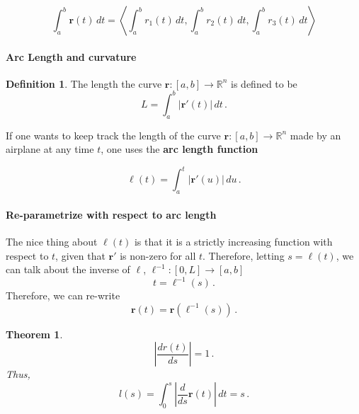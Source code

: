 \documentclass[
]{article}
\newtheorem{theorem}{Theorem}[section]
\theoremstyle{definition}
\newtheorem{definition}{Definition}[section]
\theoremstyle{definition}
\theoremstyle{definition}
\theoremstyle{definition}
\theoremstyle{remark}
\begin{document}
\begin{equation*}
    \int_a^b \mathbf{r}(t) \, dt = \left\langle \int_a^b r_1(t) \, dt, \int_a^b r_2(t) \, dt, \int_a^b r_3(t) \, dt \right\rangle
\end{equation*}

\paragraph{Arc Length and curvature}\label{arc-length-and-curvature}

\begin{definition}
The length the curve \(\mathbf{r}:[a,b] \to \mathbb{R}^n\) is defined to be
\begin{equation*}
L = \int_a^b \left| \mathbf{r}'(t) \right| \, dt \,.
\end{equation*}
\end{definition}

If one wants to keep track the length of the curve \(\mathbf{r}:[a,b] \to \mathbb{R}^n\) made by an airplane
at any time \(t\), one uses the \textbf{arc length function}

\begin{equation*}
    \ell(t) = \int_a^t \left| \mathbf{r}'(u) \right| \, du \,.
\end{equation*}

\paragraph*{Re-parametrize with respect to arc length}\label{re-parametrize-with-respect-to-arc-length}

The nice thing about \(\ell(t)\) is that it is a strictly increasing function with respect to \(t\),
given that \(\mathbf{r}'\) is non-zero for all \(t\).
Therefore, letting \(s = \ell(t)\), we can talk about the inverse of \(\ell\), \(\ell^{-1}:[0,L] \to [a,b]\)
\begin{equation*}
    t = \ell^{-1}(s) \,.
\end{equation*}
Therefore, we can re-write
\begin{equation*}
\mathbf{r}(t) = \mathbf{r}(\ell^{-1}(s)) \,.
\end{equation*}

\begin{theorem}
\[\left| \frac{d r(t)}{ds} \right| = 1 \,.\]
Thus,
\[l(s) = \int_0^s \left| \frac{d}{ds} \mathbf{r}(t) \right| \, dt = s \,.\]
\end{theorem}
\end{document}
